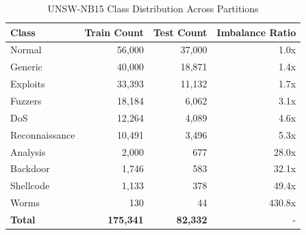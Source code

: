 \begin{table}[htbp]
\caption{UNSW-NB15 Class Distribution Across Partitions}
\label{tab:class_distribution}
\centering
\begin{tabular}{lrrr}
\hline
\textbf{Class} & \textbf{Train Count} & \textbf{Test Count} & \textbf{Imbalance Ratio} \\
\hline
Normal & 56,000 & 37,000 & 1.0x \\
Generic & 40,000 & 18,871 & 1.4x \\
Exploits & 33,393 & 11,132 & 1.7x \\
Fuzzers & 18,184 & 6,062 & 3.1x \\
DoS & 12,264 & 4,089 & 4.6x \\
Reconnaissance & 10,491 & 3,496 & 5.3x \\
Analysis & 2,000 & 677 & 28.0x \\
Backdoor & 1,746 & 583 & 32.1x \\
Shellcode & 1,133 & 378 & 49.4x \\
Worms & 130 & 44 & 430.8x \\
\hline
\textbf{Total} & \textbf{175,341} & \textbf{82,332} & - \\
\hline
\end{tabular}
\end{table}
